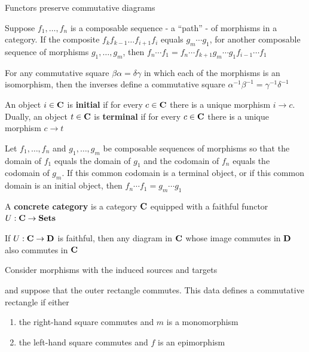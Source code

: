 \documentclass[11pt]{article}
\begin{document}
\begin{lemma}[]
Functors preserve commutative diagrams
\end{lemma}

\begin{lemma}[]
Suppose \(f_1,\dots,f_n\) is a composable sequence - a ``path'' - of morphisms in a category. If the
composite \(f_kf_{k-1}\dots f_{i+1}f_i\) equals \(g_m\cdots g_1\), for another composable sequence of
morphisms \(g_1,\dots,g_m\), then \(f_n\cdots f_1=f_n\cdots f_{k+1}g_m\cdots g_1f_{i-1}\cdots f_1\)
\end{lemma}

\begin{lemma}[]
For any commutative square \(\beta\alpha=\delta\gamma\) in which each of the morphisms is an isomorphism, then the
inverses define a commutative square \(\alpha^{-1}\beta^{-1}=\gamma^{-1}\delta^{-1}\)
\end{lemma}

\begin{definition}[]
An object \(i\in\operatorname{\textbf{C}}\) is \textbf{initial} if for every \(c\in\operatorname{\textbf{C}}\) there is a unique morphism \(i\to c\). Dually,
an object \(t\in\operatorname{\textbf{C}}\) is \textbf{terminal} if for every \(c\in\operatorname{\textbf{C}}\) there is a unique morphism \(c\to t\)
\end{definition}

\begin{lemma}[]
Let \(f_1,\dots,f_n\) and \(g_1,\dots,g_m\) be composable sequences of morphisms so that the domain
of \(f_1\) equals the domain of \(g_1\) and the codomain of \(f_n\) equals the codomain
of \(g_m\). If this common codomain is a terminal object, or if this common domain is an initial
object, then \(f_n\cdots f_1=g_m\cdots g_1\)
\end{lemma}

\begin{definition}[]
A \textbf{concrete category} is a category \(\operatorname{\textbf{C}}\) equipped with a faithful functor \(U:\operatorname{\textbf{C}}\to\operatorname{\textbf{Sets}}\)
\end{definition}

\begin{lemma}[]
If \(U:\operatorname{\textbf{C}}\to\operatorname{\textbf{D}}\) is faithful, then any diagram in \(\operatorname{\textbf{C}}\) whose image commutes in \(\operatorname{\textbf{D}}\) also commutes
in \(\operatorname{\textbf{C}}\)
\end{lemma}

\begin{lemma}[]
Consider morphisms with the induced sources and targets
\begin{center}\end{center}
and suppose that the outer rectangle commutes. This data defines a commutative rectangle if
either
\begin{enumerate}
\item the right-hand square commutes and \(m\) is a monomorphism
\item the left-hand square commutes and \(f\) is an epimorphism
\end{enumerate}
\end{lemma}
\end{document}
